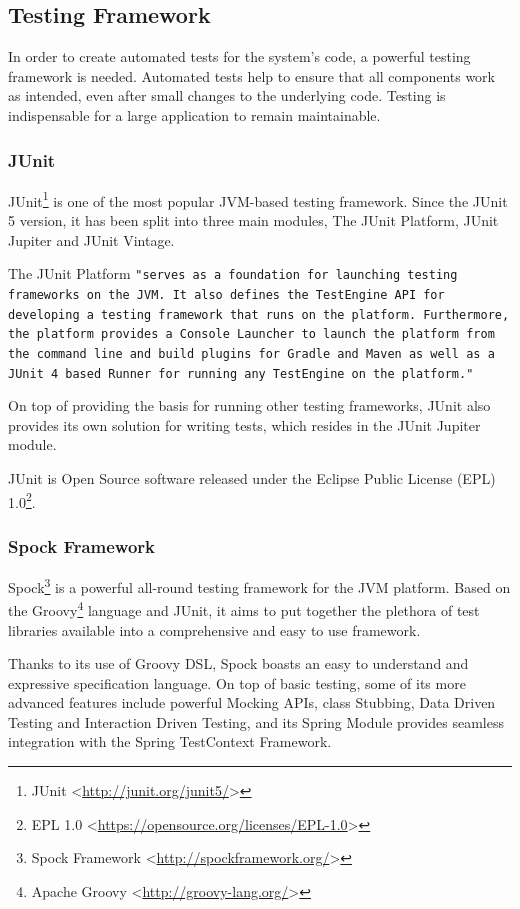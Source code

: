 \subsection{Testing Framework}
In order to create automated tests for the system's code, a powerful testing framework is needed. Automated tests help to ensure that all components work as intended, even after small changes to the underlying code. Testing is indispensable for a large application to remain maintainable.

\subsubsection{JUnit}
JUnit\footnote{JUnit <\url{http://junit.org/junit5/}>} is one of the most popular JVM-based testing framework. Since the JUnit 5 version, it has been split into three main modules, The JUnit Platform, JUnit Jupiter and JUnit Vintage.

The JUnit Platform \texttt{"serves as a foundation for launching testing frameworks on the JVM. It also defines the TestEngine API for developing a testing framework that runs on the platform. Furthermore, the platform provides a Console Launcher to launch the platform from the command line and build plugins for Gradle and Maven as well as a JUnit 4 based Runner for running any TestEngine on the platform."}\cite{junit}

On top of providing the basis for running other testing frameworks, JUnit also provides its own solution for writing tests, which resides in the JUnit Jupiter module.

JUnit is Open Source software released under the Eclipse Public License (EPL) 1.0\footnote{EPL 1.0 <\url{https://opensource.org/licenses/EPL-1.0}>}.

\subsubsection{Spock Framework} \label{analysis:spock}
Spock\footnote{Spock Framework <\url{http://spockframework.org/}>} is a powerful all-round testing framework for the JVM platform. Based on the Groovy\footnote{Apache Groovy <\url{http://groovy-lang.org/}>} language and JUnit, it aims to put together the plethora of test libraries available into a comprehensive and easy to use framework. 

Thanks to its use of Groovy DSL, Spock boasts an easy to understand and expressive specification language. On top of basic testing, some of its more advanced features include powerful Mocking APIs, class Stubbing, Data Driven Testing and Interaction Driven Testing, and its Spring Module provides seamless integration with the Spring TestContext Framework\cite{spock}.

